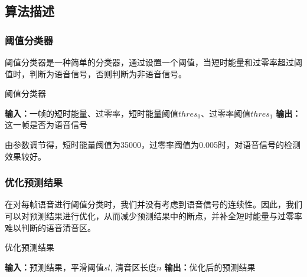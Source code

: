 \documentclass[a4paper]{article}
\begin{document}
\subsection{算法描述}


\subsubsection{阈值分类器}

阈值分类器是一种简单的分类器，通过设置一个阈值，当短时能量和过零率超过阈值时，判断为语音信号，否则判断为非语音信号。

\begin{algorithm}[H]
    \caption{阈值分类器}
    \begin{algorithmic}[1]
        \State\textbf{输入：}一帧的短时能量、过零率，短时能量阈值$thres_0$、过零率阈值$thres_1$
        \State\textbf{输出：}这一帧是否为语音信号
        \State{}
        \Else
        \State{}
        \EndIf
    \end{algorithmic}
\end{algorithm}

由参数调节得，短时能量阈值为35000，过零率阈值为0.005时，对语音信号的检测效果较好。

\subsubsection{优化预测结果}

在对每帧语音进行阈值分类时，我们并没有考虑到语音信号的连续性。因此，我们可以对预测结果进行优化，从而减少预测结果中的断点，并补全短时能量与过零率难以判断的语音清音区。

\begin{algorithm}[H]
    \caption{优化预测结果}
    \begin{algorithmic}[1]
        \State\textbf{输入：}预测结果，平滑阈值$sl$, 清音区长度$n$
        \State\textbf{输出：}优化后的预测结果
        \EndIf
        \EndFor
    \end{algorithmic}
\end{algorithm}
\end{document}
